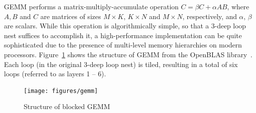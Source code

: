 GEMM performs a matrix-multiply-accumulate operation $C = \beta C + \alpha A B$,
where $A, B$ and $C$ are matrices of sizes
$M \times K$, $K \times N$ and $M \times N$, respectively,
and $\alpha$, $\beta$ are scalars.
While this operation is algorithmically simple,
so that a 3-deep loop nest suffices to accomplish it,
a high-performance implementation can be quite
sophisticated due to the presence of multi-level memory
hierarchies on modern processors.
Figure~\ref{fig:gemm} shows the structure of GEMM from
the OpenBLAS library~\cite{openblas}.
Each loop (in the original 3-deep loop nest) is tiled,
resulting in a total of six loops (referred to as layers 1 -- 6).

\begin{figure}[t]
  \centering
  \texttt{[image: figures/gemm]}
  \caption{Structure of blocked GEMM}
  \label{fig:gemm}
\end{figure}

